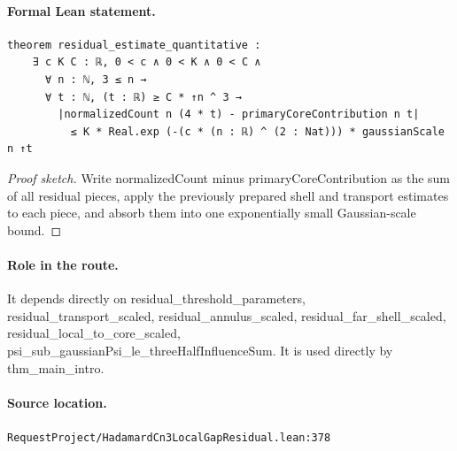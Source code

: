 \medskip
\paragraph{Formal Lean statement.}
\begin{verbatim}
theorem residual_estimate_quantitative :
    ∃ c K C : ℝ, 0 < c ∧ 0 < K ∧ 0 < C ∧
      ∀ n : ℕ, 3 ≤ n →
      ∀ t : ℕ, (t : ℝ) ≥ C * ↑n ^ 3 →
        |normalizedCount n (4 * t) - primaryCoreContribution n t|
          ≤ K * Real.exp (-(c * (n : ℝ) ^ (2 : Nat))) * gaussianScale n ↑t
\end{verbatim}
\begin{proof}[Proof sketch]
Write normalizedCount minus primaryCoreContribution as the sum of all residual pieces, apply the previously prepared shell and transport estimates to each piece, and absorb them into one exponentially small Gaussian-scale bound.
\end{proof}
\paragraph{Role in the route.}
It depends directly on residual\_threshold\_parameters, residual\_transport\_scaled, residual\_annulus\_scaled, residual\_far\_shell\_scaled, residual\_local\_to\_core\_scaled, psi\_sub\_gaussianPsi\_le\_threeHalfInfluenceSum. It is used directly by thm\_main\_intro.
\paragraph{Source location.}
\texttt{RequestProject/HadamardCn3LocalGapResidual.lean:378}
\medskip
